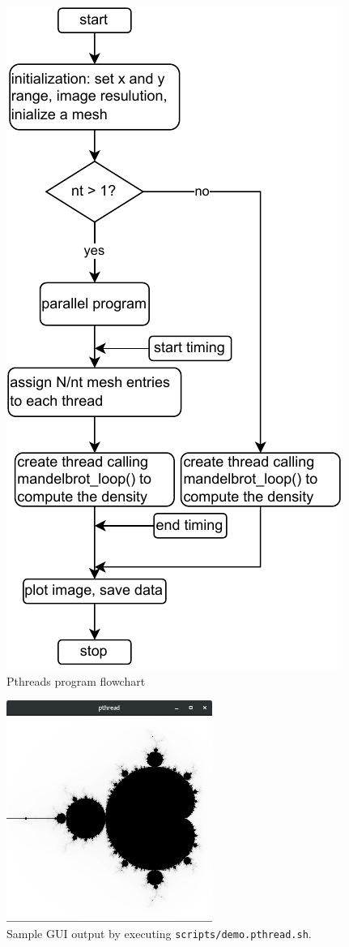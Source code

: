 \documentclass[twoside,12pt]{article}
\theoremstyle{definition}
\theoremstyle{remark}
\begin{document}
\begin{figure}[h!]
    \centering
    \includegraphics[scale=1.35]{../flowchart_pthread.drawio.pdf}
    \caption{Pthreads program flowchart}
    \label{fig:pthflow}
\end{figure}

\begin{figure}[h!]
    \centering
    \includegraphics[width=0.6\textwidth]{../demo.png}
    \caption{Sample GUI output by executing \lstinline|scripts/demo.pthread.sh|.}
    \label{fig:demo}
\end{figure}
\end{document}
